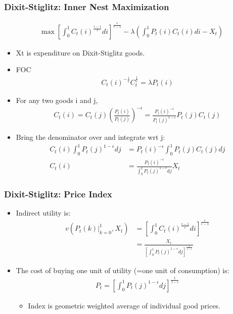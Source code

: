 \documentclass[english,xcolor=svgnames]{beamer}
\begin{document}
\begin{frame}
\frametitle{Dixit-Stiglitz: Inner Nest Maximization}
\begin{align*}
	\max \left[\int_0^1 C_t(i)^{\frac{\epsilon-1}{\epsilon}}di\right]^{\frac{\epsilon}{\epsilon-1}}-\lambda\left(\int_0^1 P_t(i) C_{t}(i)di-X_t\right)
\end{align*}
\begin{itemize}
	\item Xt is expenditure on Dixit-Stiglitz goods.
	\item FOC
	\begin{align*}
		C_t(i)^{-\frac{1}{\epsilon}}C_t^{\frac{1}{\epsilon}}=\lambda P_t(i)
	\end{align*}
	\item For any two goods i and j,
	\begin{align*}
		C_t(i)=C_t(j)\left(\frac{P_t(i)}{P_t(j)}\right)^{-\epsilon}=\frac{P_t(i)^{-\epsilon}}{P_t(j)^{1-\epsilon}}P_{t}(j)C_{t}(j)
	\end{align*}
	\item Bring the denominator over and integrate wrt j:
	\begin{align*}
		C_t(i)\int_0^1 P_t(j)^{1-\epsilon}dj&=P_t(i)^{-\epsilon}\int_0^1 P_{t}(j)C_{t}(j)dj \\
		C_t(i)&=\frac{P_t(i)^{-\epsilon}}{\int_0^1 P_t(j)^{1-\epsilon}dj}X_t
	\end{align*}
\end{itemize}
\end{frame}


\begin{frame}
\frametitle{Dixit-Stiglitz: Price Index}
\begin{itemize}
	\item Indirect utility is:
	\begin{align*}
		v(P_t(k)|_{k=0}^{1},X_t) &= \left[\int_0^1 C_t(i)^{\frac{\epsilon-1}{\epsilon}}di\right]^{\frac{\epsilon}{\epsilon-1}}\\
		&=\frac{X_t}{\left[\int_0^1 P_t(j)^{1-\epsilon}dj\right]^{\frac{1}{1-\epsilon}}}
	\end{align*}
	\item The cost of buying one unit of utility (=one unit of consumption) is:
	\begin{align*}
		P_t = \left[\int_0^1 P_t(j)^{1-\epsilon}dj\right]^{\frac{1}{1-\epsilon}}
	\end{align*}
	\begin{itemize}
			\item Index is geometric weighted average of individual good prices.
		\end{itemize}
\end{itemize}
\end{frame}
\end{document}
